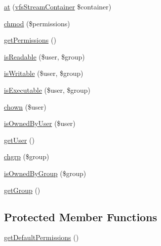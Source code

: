 \begin{DoxyCompactItemize}
\mbox{\hyperlink{classorg_1_1bovigo_1_1vfs_1_1vfs_stream_abstract_content_a807677a6a863886bc4aa2dbc1f473d56}{at}} (\mbox{\hyperlink{interfaceorg_1_1bovigo_1_1vfs_1_1vfs_stream_container}{vfs\+Stream\+Container}} \$container)
\item 
\mbox{\hyperlink{classorg_1_1bovigo_1_1vfs_1_1vfs_stream_abstract_content_a6c64687533218867184ace2d0015b230}{chmod}} (\$permissions)
\item 
\mbox{\hyperlink{classorg_1_1bovigo_1_1vfs_1_1vfs_stream_abstract_content_a98e8f81c4e0869a6adf4a36ca1a6860a}{get\+Permissions}} ()
\item 
\mbox{\hyperlink{classorg_1_1bovigo_1_1vfs_1_1vfs_stream_abstract_content_a6e17ffc20ba30d5013b65b8f8c878363}{is\+Readable}} (\$user, \$group)
\item 
\mbox{\hyperlink{classorg_1_1bovigo_1_1vfs_1_1vfs_stream_abstract_content_a0dfcddc1935dbacac2d92b58c86a6743}{is\+Writable}} (\$user, \$group)
\item 
\mbox{\hyperlink{classorg_1_1bovigo_1_1vfs_1_1vfs_stream_abstract_content_aa05f3a5ff79b553dfe46fd51006459e0}{is\+Executable}} (\$user, \$group)
\item 
\mbox{\hyperlink{classorg_1_1bovigo_1_1vfs_1_1vfs_stream_abstract_content_adc7dd498252edfe9eef1bdb602edcbdb}{chown}} (\$user)
\item 
\mbox{\hyperlink{classorg_1_1bovigo_1_1vfs_1_1vfs_stream_abstract_content_ad94371c199637d2e0b56ed9771d3fbf6}{is\+Owned\+By\+User}} (\$user)
\item 
\mbox{\hyperlink{classorg_1_1bovigo_1_1vfs_1_1vfs_stream_abstract_content_ae81b7186fb97a7c6457edcc68c9aa2ef}{get\+User}} ()
\item 
\mbox{\hyperlink{classorg_1_1bovigo_1_1vfs_1_1vfs_stream_abstract_content_ae3667c8a6ad2f23f1163ba4533a20525}{chgrp}} (\$group)
\item 
\mbox{\hyperlink{classorg_1_1bovigo_1_1vfs_1_1vfs_stream_abstract_content_a9fd5109b1a5bdb7e28dd6021e914e907}{is\+Owned\+By\+Group}} (\$group)
\item 
\mbox{\hyperlink{classorg_1_1bovigo_1_1vfs_1_1vfs_stream_abstract_content_a4f44e7bc9de772c21b4304d11e87bf16}{get\+Group}} ()
\end{DoxyCompactItemize}
\subsection*{Protected Member Functions}
\begin{DoxyCompactItemize}
\item 
\mbox{\hyperlink{classorg_1_1bovigo_1_1vfs_1_1vfs_stream_abstract_content_a5a7e3863035fc9138bf0c7c486a472cb}{get\+Default\+Permissions}} ()
\end{DoxyCompactItemize}

